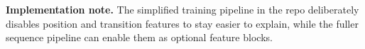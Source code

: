 \documentclass[11pt]{article}
\begin{document}
\vspace{1em}

\noindent
{}

\vspace{0.7em}

\normalsize
\noindent\textbf{Implementation note.}
The simplified training pipeline in the repo deliberately disables position and transition features to stay easier to explain,
while the fuller sequence pipeline can enable them as optional feature blocks.
\end{document}
